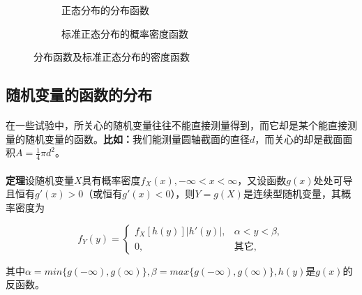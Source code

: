 \begin{figure}[H]
\centering
  \begin{subfigure}[t]{0.48\linewidth}
    \centering
      
      \caption{正态分布的分布函数}
  \end{subfigure}
  \begin{subfigure}[t]{0.48\linewidth}
    \centering
      
      \caption{标准正态分布的概率密度函数}
  \end{subfigure}
  \caption{分布函数及标准正态分布的密度函数}
  \label{分布函数及标准正态分布的密度函数}
\end{figure}

\subsection{随机变量的函数的分布}
\paragraph{}
在一些试验中，所关心的随机变量往往不能直接测量得到，而它却是某个能直接测量的随机变量的函数。\textbf{比如：}我们能测量圆轴截面的直径$d$，而关心的却是截面面积$A=\frac{1}{4}\pi d^2$。

\paragraph{}
\textbf{定理\quad}设随机变量$X$具有概率密度$f_X(x), -\infty < x < \infty$，又设函数$g(x)$处处可导且恒有$g'(x)>0$（或恒有$g'(x)<0$），则$Y=g(X)$是连续型随机变量，其概率密度为

\begin{equation}
  f_Y(y) = \left\{ \begin{array}{ll}
    f_X[h(y)]|h'(y)|, & \alpha < y < \beta, \\ 0, & \text{其它,}
  \end{array}\right.
\end{equation}

其中$\alpha=min\{g(-\infty),g(\infty)\}, \beta=max\{g(-\infty),g(\infty)\}, h(y)$是$g(x)$的反函数。
